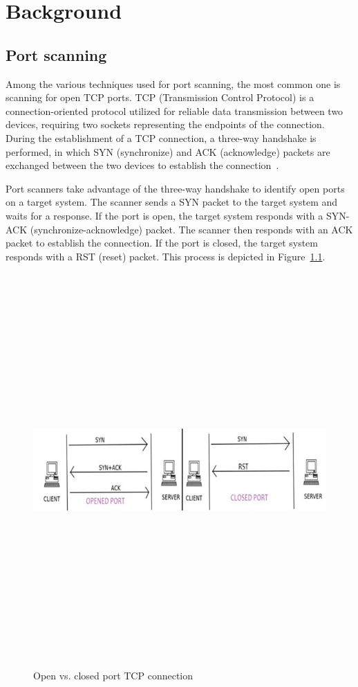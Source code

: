 \chapter{Background}

\section{Port scanning}

Among the various techniques used for port scanning, the most common one is scanning for open TCP ports. TCP (Transmission Control Protocol) is a connection-oriented protocol utilized for reliable data transmission between two devices, requiring two sockets representing the endpoints of the connection. During the establishment of a TCP connection, a three-way handshake is performed, in which SYN (synchronize) and ACK (acknowledge) packets are exchanged between the two devices to establish the connection~.

Port scanners take advantage of the three-way handshake to identify open ports on a target system. The scanner sends a SYN packet to the target system and waits for a response. If the port is open, the target system responds with a SYN-ACK (synchronize-acknowledge) packet. The scanner then responds with an ACK packet to establish the connection. If the port is closed, the target system responds with a RST (reset) packet. This process is depicted in Figure~\ref{fig:open-vs-closed}.

\begin{figure}[h]
    \centering
    \includegraphics[width=15cm, height=15cm, keepaspectratio]{background/img/open_vs_closed_port.png}
    \caption{Open vs. closed port TCP connection~\protect{}}
    \label{fig:open-vs-closed}
\end{figure}

